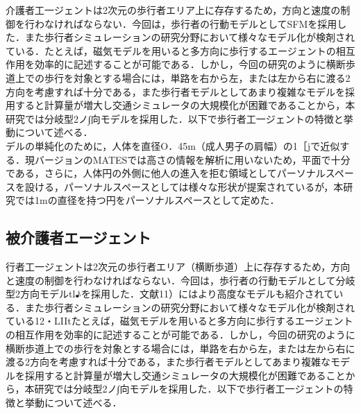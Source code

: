 介護者工一ジェントは2次元の歩行者エリア上に存存するため，方向と速度の制御を行わなければならない．今回は，歩行者の行動モデルとしてSFMを採用した．また歩行者シミュレーションの研究分野において様々なモデル化が検剤されている\cite{ex_pedestrian_simulation_1,ex_pedestrian_simulation_2}．たとえば，磁気モデルを用いると多方向に歩行するエージェントの相互作用を効率的に記述することが可能である．しかし，今回の研究のように横断歩道上での歩行を対象とする場合には，単路を右から左，または左から右に渡る2方向を考慮すれば十分である，また歩行者モデルとしてあまり複雑なモデルを採用すると計算量が増大し交通シミュレータの大規模化が困難であることから，本研究では分岐型2ノ∫向モデルを採用した．以下で歩行者工一ジェントの特徴と挙動について述べる．\\
デルの単純化のために，人体を直径O．45m（成人男子の肩幅）の1［jで近似する．現バージョンのMATESでは高さの情報を解析に用いないため，平面で十分である，さらに，人体円の外側に他人の進入を拒む領域としてパーソナルスペースを設ける，パーソナルスペースとしては様々な形状が提案されているが\cite{ex_personal_space}，本研究では1mの直径を持つ円をパーソナルスペースとして定めた．

\subsection{被介護者エージェント}

行者工一ジェントは2次元の歩行者エリア（横断歩道）上に存存するため，方向と速度の制御を行わなければならない．今回は，歩行者の行動モデルとして分岐型2方向モデルtl♪を採用した．文献11）にはより高度なモデルも紹介されている．また歩行者シミュレーションの研究分野において様々なモデル化が検剤されている12・LIItたとえば，磁気モデルを用いると多方向に歩行するエージェントの相互作用を効率的に記述することが可能である．しかし，今回の研究のように横断歩道上での歩行を対象とする場合には，単路を右から左，または左から右に渡る2方向を考慮すれば十分である，また歩行者モデルとしてあまり複雑なモデルを採用すると計算量が増大し交通シミュレータの大規模化が困難であることから，本研究では分岐型2ノ∫向モデルを採用した．以下で歩行者工一ジェントの特徴と挙動について述べる．
